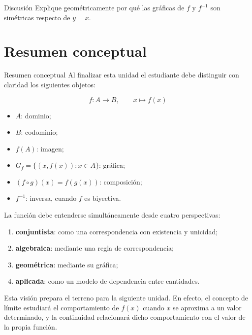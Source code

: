 \documentclass[aspectratio=169,10pt]{beamer}
\begin{document}
\begin{frame}{Discusión}
\Large Explique geométricamente por qué las gráficas de $f$ y $f^{-1}$ son simétricas respecto de $y=x$.
\end{frame}


\section{Resumen conceptual}
\begin{frame}{Resumen conceptual}
Al finalizar esta unidad el estudiante debe distinguir con claridad los
siguientes objetos:

\[
\boxed{
f:A\to B,\qquad x\mapsto f(x)
}
\]

\begin{itemize}
    \item $A$: dominio;
    \item $B$: codominio;
    \item $f(A)$: imagen;
    \item $G_f=\{(x,f(x)):x\in A\}$: gráfica;
    \item $(f\circ g)(x)=f(g(x))$: composición;
    \item $f^{-1}$: inversa, cuando $f$ es biyectiva.
\end{itemize}

La función debe entenderse simultáneamente desde cuatro perspectivas:
\begin{enumerate}
    \item \textbf{conjuntista}: como una correspondencia con existencia y
    unicidad;
    \item \textbf{algebraica}: mediante una regla de correspondencia;
    \item \textbf{geométrica}: mediante su gráfica;
    \item \textbf{aplicada}: como un modelo de dependencia entre cantidades.
\end{enumerate}

Esta visión prepara el terreno para la siguiente unidad. En efecto, el concepto
de límite estudiará el comportamiento de $f(x)$ cuando $x$ se aproxima a un
valor determinado, y la continuidad relacionará dicho comportamiento con el
valor de la propia función.

\end{frame}
\end{document}

